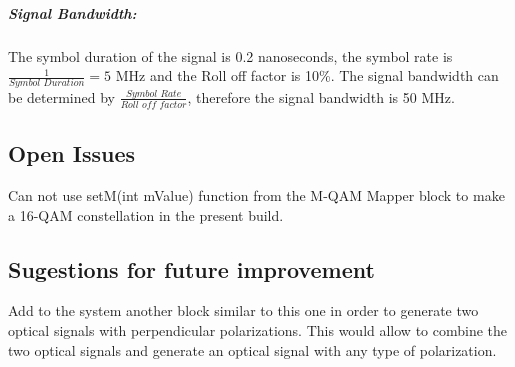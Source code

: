 \subparagraph*{Signal Bandwidth:}

The symbol duration of the signal is 0.2 nanoseconds, the symbol rate is $\frac{1}{\textit{Symbol Duration}} = 5$ MHz and the Roll off factor is 10\%. The signal bandwidth can be determined by $\frac{\textit{Symbol Rate}}{\textit{Roll off factor}}$, therefore the signal bandwidth is 50 MHz.

\subsection*{Open Issues}

Can not use setM(int mValue) function from the M-QAM Mapper block to make a 16-QAM constellation in the present build.

\subsection*{Sugestions for future improvement}

Add to the system another block similar to this one in order to generate two optical signals with perpendicular polarizations. This would allow to combine the two optical signals and generate an optical signal with any type of polarization.
